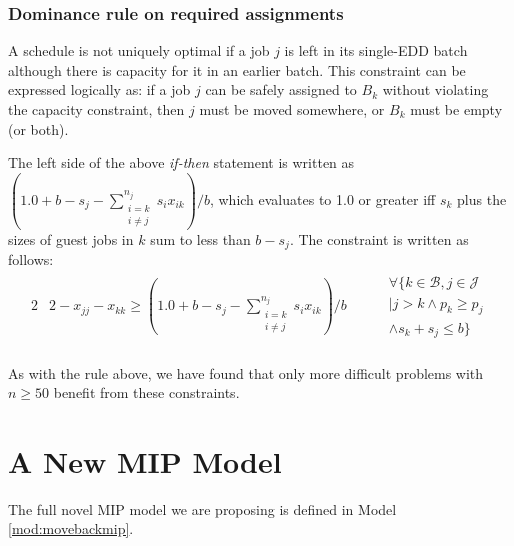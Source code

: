 \documentclass[oribibl]{llncs}
\begin{document}
\subsubsection{Dominance rule on required assignments}
A schedule is not uniquely optimal if a job $j$ is left in its single-EDD batch
although there is capacity for it in an earlier batch. This constraint can
be expressed logically as: if a job $j$ can be safely assigned to $B_k$ without
violating the capacity constraint, then $j$ must be moved somewhere, or
$B_k$ must be empty (or both). 

The left side of the above \textit{if-then} statement is written as $(1.0 + b -
s_j - \sum_{\substack{{i = k}\\{i \neq j}}}^{n_j} s_i x_{ik}) / b$, which
evaluates to 1.0 or greater iff $s_k$ plus the sizes of guest jobs in $k$ sum to
less than $b - s_j$. The constraint is written as follows:
\begin{alignat}{2}
&2 - x_{jj} - x_{kk} \geq \left(1.0 + b - s_j -
\sum_{\substack{{i = k}\\{i \neq j}}}^{n_j} s_i
x_{ik}\right) / b \quad && \begin{gathered} \forall \{k \in \mathcal{B}, j \in \mathcal{J} \\| j > k 
\land p_k \geq p_j \\ \land s_k + s_j \leq b\}\end{gathered}
\end{alignat}\\

As with the rule above, we have found that only more difficult problems with $n
\geq 50$ benefit from these constraints.

\section{A New MIP Model}
\label{sec:newMIPmodel}

The full novel MIP model we are proposing is defined in Model \ref{mod:movebackmip}.
\end{document}
